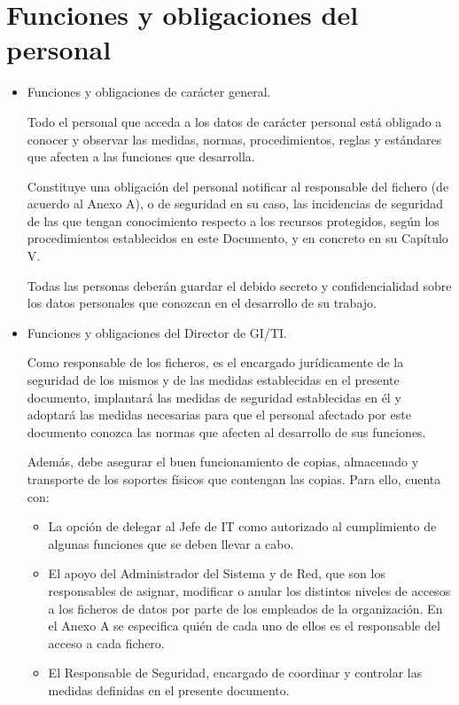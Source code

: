 \documentclass[a4paper,11pt,bibtotoc,noliststotoc]{scrbook}
\begin{document}
\chapter{Funciones y obligaciones del personal}

\begin{itemize}
\item Funciones y obligaciones de carácter general.

Todo el personal que acceda a los datos de carácter personal está obligado a conocer y observar las medidas, normas, procedimientos, reglas y estándares que afecten a las funciones que desarrolla.

Constituye una obligación del personal notificar al responsable del fichero (de acuerdo al Anexo A), o de seguridad en su caso, las incidencias de seguridad de las que tengan conocimiento respecto a los recursos protegidos, según los procedimientos establecidos en este Documento, y en concreto en su Capítulo V.

Todas las personas deberán guardar el debido secreto y confidencialidad sobre los datos personales que conozcan en el desarrollo de su trabajo.

\item Funciones y obligaciones del Director de GI/TI. 

Como responsable de los ficheros, es el encargado jurídicamente de la seguridad de los mismos y de las medidas establecidas en el presente documento, implantará las medidas de seguridad establecidas en él y adoptará las medidas necesarias para que el personal afectado por este documento conozca las
normas que afecten al desarrollo de sus funciones.

Además, debe asegurar el buen funcionamiento de copias, almacenado y transporte de los soportes físicos que contengan las copias. Para ello, cuenta con:

\begin {itemize}
\item La opción de delegar al Jefe de IT como autorizado al cumplimiento de algunas funciones que se deben llevar a cabo.

\item El apoyo del Administrador del Sistema y de Red, que son los responsables de asignar, modificar o anular los distintos niveles de accesos a los ficheros de datos por parte de los empleados de la organización. En el Anexo A se especifica quién de cada uno de ellos es el responsable del acceso a cada fichero.

\item El Responsable de Seguridad, encargado de coordinar y controlar las medidas definidas en el presente documento.
\end{itemize}

\end{itemize}
\end{document}
